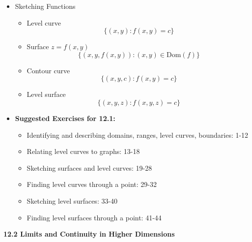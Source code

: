 \documentclass[12pt]{article}
\newcommand{\<}{\left<}
\renewcommand{\>}{\right>}
\begin{document}
\begin{itemize}
  \item Sketching Functions

    \begin{itemize}
      \item Level curve
        \[\{(x,y):f(x,y)=c\}\]
      \item Surface $z=f(x,y)$
        \[\{(x,y,f(x,y)): (x,y)\in \textrm{Dom}(f)\}\]
      \item Contour curve 
        \[\{(x,y,c): f(x,y)=c\}\]
      \item Level surface
        \[\{(x,y,z):f(x,y,z)=c\}\]
    \end{itemize}

\item \textbf{ Suggested Exercises for 12.1:}

  \begin{itemize}
  \item Identifying and describing domains, ranges, level curves, boundaries: 1-12
  \item Relating level curves to graphs: 13-18
  \item Sketching surfaces and level curves: 19-28
  \item Finding level curves through a point: 29-32
  \item Sketching level surfaces: 33-40
  \item Finding level surfaces through a point: 41-44
  \end{itemize}
  
\end{itemize}

\newpage

\centerline{\bf 12.2 Limits and Continuity in Higher Dimensions}
\end{document}
